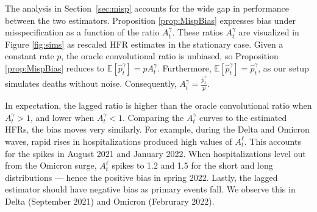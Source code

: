 \documentclass{article}
\renewcommand{\hat}{\widehat} %
\begin{document}
The analysis in Section~\ref{sec:misp} accounts for the wide gap in performance between the two estimators. 
Proposition \ref{prop:MispBias} expresses bias under misspecification as a function of the ratio $A_t^\gamma$. 
These ratios $A_t^\gamma$ are visualized in Figure \ref{fig:sims} as rescaled HFR estimates in the stationary case.
Given a constant rate $p$, the oracle convolutional ratio is unbiased, so Proposition \ref{prop:MispBias} reduces to $\mathbb{E}[\hat{p}_t^\gamma] = p A_t^\gamma$. Furthermore, $\mathbb{E}[\hat{p}_t^\gamma] = \hat{p}_t^\gamma$, as our setup simulates deaths without noise. Consequently, $A_t^\gamma = \frac{\hat{p}_t^\gamma }{p}$. 

In expectation, the lagged ratio is higher than the oracle convolutional ratio when $A_t^\gamma>1$, and lower when $A_t^\gamma<1$. Comparing the $A_t^\gamma$ curves to the estimated HFRs, the bias moves very similarly. 
For example, 
during the Delta and Omicron waves, rapid rises in hospitalizations produced high values of $A_t^\ell$. This accounts for the spikes in August 2021 and January 2022. %
When hospitalizations level out from the Omicron surge, $A_t^\ell$ spikes to 1.2 and 1.5 for the short and long distributions --- hence the positive bias in spring 2022. 
Lastly, the lagged estimator should have negative bias as primary events fall. We observe this in Delta (September 2021) and Omicron (Februrary 2022). 
\end{document}
